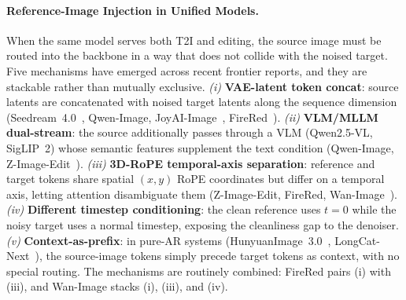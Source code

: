 \paragraph{Reference-Image Injection in Unified Models.}
When the same model serves both T2I and editing, the source image must be routed into the backbone in a way that does not collide with the noised target. Five mechanisms have emerged across recent frontier reports, and they are stackable rather than mutually exclusive. \emph{(i)} \textbf{VAE-latent token concat}: source latents are concatenated with noised target latents along the sequence dimension (Seedream~4.0~\citep{seedream2025seedream}, Qwen-Image, JoyAI-Image~\citep{jdjoyaiimage}, FireRed~\citep{team2026firered}). \emph{(ii)} \textbf{VLM/MLLM dual-stream}: the source additionally passes through a VLM (Qwen2.5-VL, SigLIP~2) whose semantic features supplement the text condition (Qwen-Image, Z-Image-Edit~\citep{cai2025z}). \emph{(iii)} \textbf{3D-RoPE temporal-axis separation}: reference and target tokens share spatial $(x,y)$ RoPE coordinates but differ on a temporal axis, letting attention disambiguate them (Z-Image-Edit, FireRed, Wan-Image~\citep{mao2026wan}). \emph{(iv)} \textbf{Different timestep conditioning}: the clean reference uses $t{=}0$ while the noisy target uses a normal timestep, exposing the cleanliness gap to the denoiser. \emph{(v)} \textbf{Context-as-prefix}: in pure-AR systems (HunyuanImage~3.0~\citep{cao2025hunyuanimage}, LongCat-Next~\citep{team2026longcat}), the source-image tokens simply precede target tokens as context, with no special routing. The mechanisms are routinely combined: FireRed pairs (i) with (iii), and Wan-Image stacks (i), (iii), and (iv).


